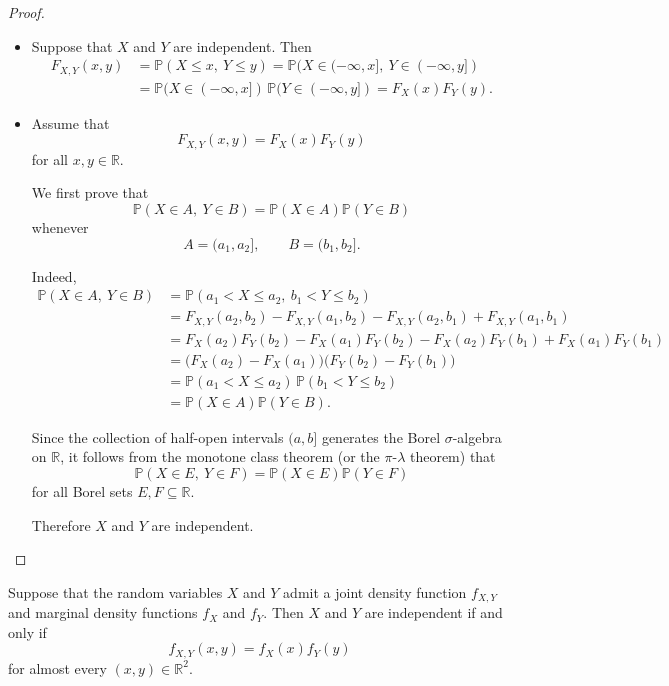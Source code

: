 \begin{proof}
\hfill
\begin{itemize}
    \item[\((\implies)\)]
    Suppose that \(X\) and \(Y\) are independent. Then
    \begin{align*}
        F_{X,Y}(x,y)
        &= \mathbb{P}(X\le x,\ Y\le y) = \mathbb{P}(X\in (-\infty,x],\ Y\in (-\infty,y]) \\
        &= \mathbb{P}(X\in (-\infty,x]) \,
           \mathbb{P}(Y\in (-\infty,y]) = F_X(x)F_Y(y).
    \end{align*}

    \item[\((\impliedby)\)]
    Assume that
    \[
    F_{X,Y}(x,y)=F_X(x)F_Y(y)
    \]
    for all \(x,y\in\mathbb{R}\).

    We first prove that
    \[
    \mathbb{P}(X\in A,\ Y\in B)
    =
    \mathbb{P}(X\in A)\mathbb{P}(Y\in B)
    \]
    whenever
    \[
    A=(a_1,a_2], \qquad B=(b_1,b_2].
    \]

    Indeed,
    \begin{align*}
        \mathbb{P}(X\in A,\ Y\in B)
        &=
        \mathbb{P}(a_1<X\le a_2,\ b_1<Y\le b_2) \\
        &=
        F_{X,Y}(a_2,b_2)
        -F_{X,Y}(a_1,b_2)
        -F_{X,Y}(a_2,b_1)
        +F_{X,Y}(a_1,b_1) \\
        &=
        F_X(a_2)F_Y(b_2)
        -F_X(a_1)F_Y(b_2)
        -F_X(a_2)F_Y(b_1)
        +F_X(a_1)F_Y(b_1) \\
        &=
        \bigl(F_X(a_2)-F_X(a_1)\bigr)
        \bigl(F_Y(b_2)-F_Y(b_1)\bigr) \\
        &=
        \mathbb{P}(a_1<X\le a_2)\,
        \mathbb{P}(b_1<Y\le b_2) \\
        &=
        \mathbb{P}(X\in A)\mathbb{P}(Y\in B).
    \end{align*}

    Since the collection of half-open intervals \((a,b]\) generates the
    Borel \(\sigma\)-algebra on \(\mathbb{R}\), it follows from the
    monotone class theorem (or the \(\pi\)-\(\lambda\) theorem) that
    \[
    \mathbb{P}(X\in E,\ Y\in F)
    =
    \mathbb{P}(X\in E)\mathbb{P}(Y\in F)
    \]
    for all Borel sets \(E,F\subseteq \mathbb{R}\).

    Therefore \(X\) and \(Y\) are independent.
\end{itemize}
\end{proof}

\begin{corollary}
Suppose that the random variables \(X\) and \(Y\) admit a joint density
function \(f_{X,Y}\) and marginal density functions \(f_X\) and \(f_Y\).
Then \(X\) and \(Y\) are independent if and only if
\[
f_{X,Y}(x,y)=f_X(x)f_Y(y)
\]
for almost every \((x,y)\in\mathbb{R}^2\).
\end{corollary}

